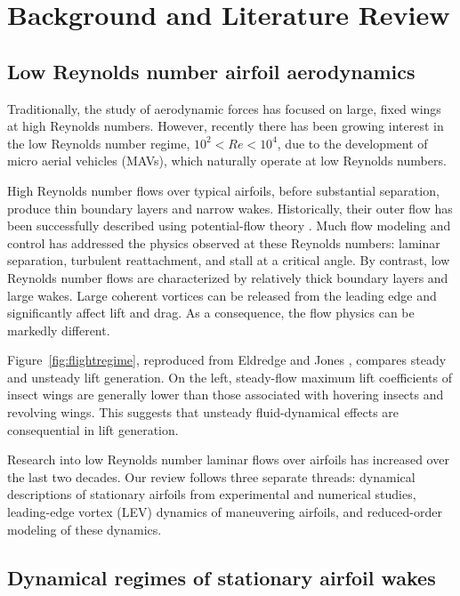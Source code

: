 \section{Background and Literature Review}
\subsection{Low Reynolds number airfoil aerodynamics}
Traditionally, the study of aerodynamic forces has focused on large, fixed wings at high Reynolds numbers. However, recently there has been growing interest in the low Reynolds number regime, $10^2<Re<10^4$, due to the development of micro aerial vehicles (MAVs), which naturally operate at low Reynolds numbers.

High Reynolds number flows over typical airfoils, before substantial separation, produce thin boundary layers and narrow wakes. Historically, their outer flow has been successfully described using potential-flow theory \cite{katz}. Much flow modeling and control has addressed the physics observed at these Reynolds numbers: laminar separation, turbulent reattachment, and stall at a critical angle. By contrast, low Reynolds number flows are characterized by relatively thick boundary layers and large wakes. Large coherent vortices can be released from the leading edge and significantly affect lift and drag. As a consequence, the flow physics can be markedly different.


Figure~\ref{fig:flightregime}, reproduced from Eldredge and Jones \cite{eldredge2019}, compares steady and unsteady lift generation. On the left, steady-flow maximum lift coefficients of insect wings are generally lower than those associated with hovering insects and revolving wings. This suggests that unsteady fluid-dynamical effects are consequential in lift generation.

Research into low Reynolds number laminar flows over airfoils has increased over the last two decades. Our review follows three separate threads: dynamical descriptions of stationary airfoils from experimental and numerical studies, leading-edge vortex (LEV) dynamics of maneuvering airfoils, and reduced-order modeling of these dynamics.

\subsection{Dynamical regimes of stationary airfoil wakes}
